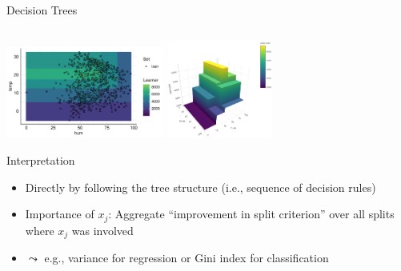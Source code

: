 \documentclass[11pt,compress,t,notes=noshow, aspectratio=169, xcolor=table]{beamer}
\begin{document}
\begin{frame}{Decision Trees }
\begin{columns}[T, totalwidth=\textwidth]
\begin{column}{0.35\textwidth}
\end{column}
\end{columns}
\vspace{-0.2cm}
\begin{center}
\includegraphics[width=0.39\textwidth]{figure/tree_surface1.pdf} \qquad  
\includegraphics[width=0.26\textwidth]{figure/tree_surface2.png}
\end{center}

\end{frame}


\begin{frame}{Interpretation}
\begin{itemize}
    \item Directly by following the tree structure (i.e., sequence of decision rules)
    \item Importance of $x_j$: Aggregate ``improvement in split criterion'' over all splits where $x_j$ was involved\\
    \item[] $\leadsto$ e.g., variance for regression or Gini index for classification
\end{itemize}

\end{frame}
\end{document}
